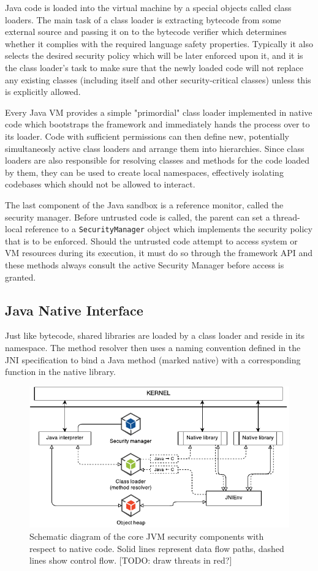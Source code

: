 \documentclass[a4paper,12pt,twoside,openright]{report}
\newcommand{\keyword}[1]{\textsf{#1}}
\newcommand{\class}[1]{\texttt{#1}}
\begin{document}
Java code is loaded into the virtual machine by a special objects called class loaders. The main task of a class loader is extracting bytecode from some external source and passing it on to the bytecode verifier which determines whether it complies with the required language safety properties. Typically it also selects the desired security policy which will be later enforced upon it, and it is the class loader's task to make sure that the newly loaded code will not replace any existing classes (including itself and other security-critical classes) unless this is explicitly allowed. 

Every Java VM provides a simple "primordial" class loader implemented in native code which bootstraps the framework and immediately hands the process over to its loader. Code with sufficient permissions can then define new, potentially simultaneosly active class loaders and arrange them into hierarchies. Since class loaders are also responsible for resolving classes and methods for the code loaded by them, they can be used to create local namespaces, effectively isolating codebases which should not be allowed to interact.

The last component of the Java sandbox is a reference monitor, called the security manager. Before untrusted code is called, the parent can set a thread-local reference to a \class{SecurityManager} object which implements the security policy that is to be enforced. Should the untrusted code attempt to access system or VM resources during its execution, it must do so through the framework API and these methods always consult the active Security Manager before access is granted.

\subsection{Java Native Interface}

Just like bytecode, shared libraries are loaded by a class loader and reside in its namespace. The method resolver then uses a naming convention defined in the JNI specification to bind a Java method (marked \keyword{native}) with a corresponding function in the native library.

\begin{figure}
	\includegraphics[width=\textwidth]{dia_jni_orig.pdf}
	\caption{Schematic diagram of the core JVM security components with respect to native code. Solid lines represent data flow paths, dashed lines show control flow. [TODO: draw threats in red?]}
	\label{fig:OverviewJNI}
\end{figure}
\end{document}
